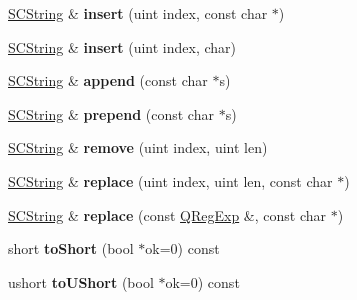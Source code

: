 \begin{DoxyCompactItemize}
\item 
\hypertarget{class_s_c_string_abab16c94f7e98ac51c397e48bf77ef28}{\hyperlink{class_s_c_string}{S\-C\-String} \& {\bfseries insert} (uint index, const char $\ast$)}\label{class_s_c_string_abab16c94f7e98ac51c397e48bf77ef28}

\item 
\hypertarget{class_s_c_string_ac2bbd2a17a8e11e7f26c5c03f9813249}{\hyperlink{class_s_c_string}{S\-C\-String} \& {\bfseries insert} (uint index, char)}\label{class_s_c_string_ac2bbd2a17a8e11e7f26c5c03f9813249}

\item 
\hypertarget{class_s_c_string_ab0fed90b41f7924fa673dbba9be734cc}{\hyperlink{class_s_c_string}{S\-C\-String} \& {\bfseries append} (const char $\ast$s)}\label{class_s_c_string_ab0fed90b41f7924fa673dbba9be734cc}

\item 
\hypertarget{class_s_c_string_a4ab2e898e90805cf41e7b515f90f10f3}{\hyperlink{class_s_c_string}{S\-C\-String} \& {\bfseries prepend} (const char $\ast$s)}\label{class_s_c_string_a4ab2e898e90805cf41e7b515f90f10f3}

\item 
\hypertarget{class_s_c_string_a2b1aa378843ada77c7f9d8005af3fcc1}{\hyperlink{class_s_c_string}{S\-C\-String} \& {\bfseries remove} (uint index, uint len)}\label{class_s_c_string_a2b1aa378843ada77c7f9d8005af3fcc1}

\item 
\hypertarget{class_s_c_string_a2a6a5142b1e348a5b69820a803b55cdf}{\hyperlink{class_s_c_string}{S\-C\-String} \& {\bfseries replace} (uint index, uint len, const char $\ast$)}\label{class_s_c_string_a2a6a5142b1e348a5b69820a803b55cdf}

\item 
\hypertarget{class_s_c_string_af593264b1d56e0a18a2cbe9b649d5fa6}{\hyperlink{class_s_c_string}{S\-C\-String} \& {\bfseries replace} (const \hyperlink{class_q_reg_exp}{Q\-Reg\-Exp} \&, const char $\ast$)}\label{class_s_c_string_af593264b1d56e0a18a2cbe9b649d5fa6}

\item 
\hypertarget{class_s_c_string_a5b0ed833bd201253bec307df94b5bdad}{short {\bfseries to\-Short} (bool $\ast$ok=0) const }\label{class_s_c_string_a5b0ed833bd201253bec307df94b5bdad}

\item 
\hypertarget{class_s_c_string_a04cc2d7dcf50661d371e4dadcde6dd2c}{ushort {\bfseries to\-U\-Short} (bool $\ast$ok=0) const }\label{class_s_c_string_a04cc2d7dcf50661d371e4dadcde6dd2c}


\end{DoxyCompactItemize}
